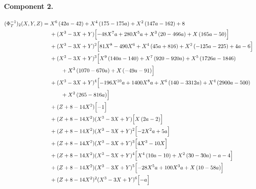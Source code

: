 \paragraph{Component 2.}
\begingroup
\footnotesize
\allowdisplaybreaks[0]
\begin{align*}
(\Phi_T^{-1})_2(X,Y,Z)={}&X^{6} \left(42 a - 42\right) + X^{4} \left(175 - 175 a\right) + X^{2} \left(147 a - 162\right) + 8\\
&{}+(X^3-3X+Y)\Bigl[- 48 X^{7} a + 280 X^{5} a + X^{3} \left(20 - 466 a\right) + X \left(165 a - 50\right)\Bigr]\\
&{}+(X^3-3X+Y)^{2}\Bigl[81 X^{8} - 490 X^{6} + X^{4} \left(45 a + 816\right) + X^{2} \left(- 125 a - 225\right) + 4 a - 6\Bigr]\\
&{}+(X^3-3X+Y)^{3}\Bigl[X^{9} \left(140 a - 140\right) + X^{7} \left(920 - 920 a\right) + X^{5} \left(1726 a - 1846\right)\\
&\qquad + X^{3} \left(1070 - 670 a\right) + X \left(- 49 a - 91\right)\Bigr]\\
&{}+(X^3-3X+Y)^{4}\Bigl[- 196 X^{10} a + 1400 X^{8} a + X^{6} \left(140 - 3312 a\right) + X^{4} \left(2900 a - 500\right)\\
&\qquad + X^{2} \left(265 - 816 a\right)\Bigr]\\
&{}+(Z+8-14X^2)\Bigl[- 1\Bigr]\\
&{}+(Z+8-14X^2)(X^3-3X+Y)\Bigl[X \left(2 a - 2\right)\Bigr]\\
&{}+(Z+8-14X^2)(X^3-3X+Y)^{2}\Bigl[- 2 X^{2} a + 5 a\Bigr]\\
&{}+(Z+8-14X^2)(X^3-3X+Y)^{3}\Bigl[4 X^{3} - 10 X\Bigr]\\
&{}+(Z+8-14X^2)(X^3-3X+Y)^{4}\Bigl[X^{4} \left(10 a - 10\right) + X^{2} \left(30 - 30 a\right) - a - 4\Bigr]\\
&{}+(Z+8-14X^2)(X^3-3X+Y)^{5}\Bigl[- 28 X^{5} a + 100 X^{3} a + X \left(10 - 58 a\right)\Bigr]\\
&{}+(Z+8-14X^2)^{2}(X^3-3X+Y)^{6}\Bigl[- a\Bigr]
\end{align*}
\endgroup

